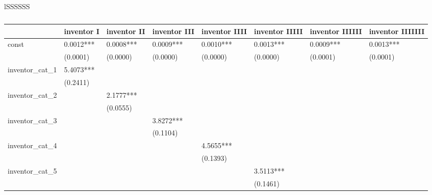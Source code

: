 \documentclass{article}
\begin{document}
\begin{table}[h]
\centering
\caption{Statistical tests for childhood exposure to innovation by patent category}
\begin{tabular}{lSSSSSS}
\toprule
\begin{table}
\caption{}
\label{}
\begin{center}
\begin{tabular}{llllllll}
\hline
                 & inventor I & inventor II & inventor III & inventor IIII & inventor IIIII & inventor IIIIII & inventor IIIIIII  \\
\hline
const            & 0.0012***  & 0.0008***   & 0.0009***    & 0.0010***     & 0.0013***      & 0.0009***       & 0.0013***         \\
                 & (0.0001)   & (0.0000)    & (0.0000)     & (0.0000)      & (0.0000)       & (0.0001)        & (0.0001)          \\
inventor\_cat\_1 & 5.4073***  &             &              &               &                &                 &                   \\
                 & (0.2411)   &             &              &               &                &                 &                   \\
inventor\_cat\_2 &            & 2.1777***   &              &               &                &                 &                   \\
                 &            & (0.0555)    &              &               &                &                 &                   \\
inventor\_cat\_3 &            &             & 3.8272***    &               &                &                 &                   \\
                 &            &             & (0.1104)     &               &                &                 &                   \\
inventor\_cat\_4 &            &             &              & 4.5655***     &                &                 &                   \\
                 &            &             &              & (0.1393)      &                &                 &                   \\
inventor\_cat\_5 &            &             &              &               & 3.5113***      &                 &                   \\
                 &            &             &              &               & (0.1461)       &                 &                   \\

\end{tabular}
\end{center}
\end{table}
\end{tabular}
\end{table}
\end{document}
